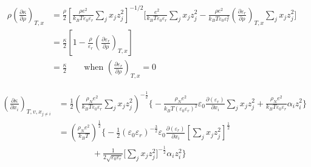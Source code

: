 \documentclass[12pt, letterpaper]{article}
\begin{document}
\begin{equation}
    \begin{aligned}
        \rho\left(\frac{\partial \kappa}{\partial \rho}\right)_{T,x}
        &=
        \frac{\rho}{2}
        \left[
            \frac{\rho e^{2}}{k_{B}T\varepsilon_{0}\varepsilon_{r}}
            \sum_{j}x_{j}z_{j}^{2}
        \right]^{-1/2}
        \Biggl[
            \frac{e^{2}}{k_{B}T\varepsilon_{0}\varepsilon_{r}}\sum_{j}x_{j}z_{j}^{2}
            -
            \frac{\rho e^{2}}{k_{B}T\varepsilon_{0}\varepsilon_{r}^{2}}
            \left(\frac{\partial \varepsilon_{r}}{\partial \rho}\right)_{T,x}
            \sum_{j}x_{j}z_{j}^{2}
        \Biggr]
        \\
        &=
        \frac{\kappa}{2}
        \left[
            1
            -
            \frac{\rho}{\varepsilon_{r}}
            \left(\frac{\partial \varepsilon_{r}}{\partial \rho}\right)_{T,x}
        \right]
        \\
        &=
        \frac{\kappa}{2}
        \qquad
        \text{when }\left(\frac{\partial \varepsilon_{r}}{\partial \rho}\right)_{T,x}=0
    \end{aligned}
    \label{eq:dkappa_dh_drho}
\end{equation}


\begin{equation}
    \begin{aligned}
        \left(\frac{\partial\kappa}{\partial x_{i}}\right)_{T,v,x_{j\neq i}}
        &=
        \frac12
        \left(\frac{\rho_{N}e^{2}}{k_{B}T\varepsilon_{0}\varepsilon_{r}}\sum_{j}x_{j}z_{j}^{2}\right)^{-\frac12}
        \Biggl\{
            -\frac{\rho_{N}e^2}{k_{B}T\left(\varepsilon_{0}\varepsilon_{r}\right)^2}
            \varepsilon_{0}\frac{\partial\left(\varepsilon_{r}\right)}{\partial x_{i}}
            \sum_{j}x_{j}z_{j}^2
            +
            \frac{\rho_{N}e^2}{k_{B}T\varepsilon_{0}\varepsilon_{r}}
            \alpha_{i}z_{i}^2
        \Biggr\}
        \\
        &=
        \left(\frac{\rho_{N}e^{2}}{k_{B}T}\right)^{\frac{1}{2}}
        \Biggl\{
            -\frac{1}{2}\left(\varepsilon_{0}\varepsilon_{r}\right)^{-\frac{3}{2}}
            \varepsilon_{0}\frac{\partial\left(\varepsilon_{r}\right)}{\partial x_{i}}
            \left[\sum_{j}x_{j}z_{j}^{2}\right]^{\frac{1}{2}}
            \\
            &\qquad\qquad
            +
            \frac{1}{2\sqrt{\varepsilon_{0}\varepsilon_{r}}}
            \Biggl[\sum_{j}x_{j}z_{j}^2\Biggr]^{-\frac{1}{2}}
            \alpha_{i}z_{i}^2
        \Biggr\}
    \end{aligned}
    \label{eq:dkappa_dh_dxi}
\end{equation}
\end{document}

